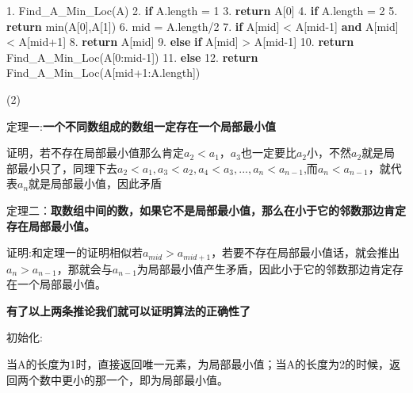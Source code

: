 \documentclass[
]{article}
\newenvironment{Shaded}{}{}
\newcommand{\BuiltInTok}[1]{#1}
\newcommand{\ControlFlowTok}[1]{\textcolor[rgb]{0.00,0.44,0.13}{\textbf{#1}}}
\newcommand{\DecValTok}[1]{\textcolor[rgb]{0.25,0.63,0.44}{#1}}
\newcommand{\FloatTok}[1]{\textcolor[rgb]{0.25,0.63,0.44}{#1}}
\newcommand{\KeywordTok}[1]{\textcolor[rgb]{0.00,0.44,0.13}{\textbf{#1}}}
\newcommand{\NormalTok}[1]{#1}
\newcommand{\OperatorTok}[1]{\textcolor[rgb]{0.40,0.40,0.40}{#1}}
\begin{document}
\begin{Shaded}
\begin{Highlighting}[]
\FloatTok{1.}\NormalTok{ Find\_A\_Min\_Loc(A)}
\FloatTok{2.}   \ControlFlowTok{if}\NormalTok{ A.length }\OperatorTok{=} \DecValTok{1}
\FloatTok{3.}     \ControlFlowTok{return}\NormalTok{ A[}\DecValTok{0}\NormalTok{]}
\FloatTok{4.}   \ControlFlowTok{if}\NormalTok{ A.length }\OperatorTok{=} \DecValTok{2}
\FloatTok{5.}     \ControlFlowTok{return} \BuiltInTok{min}\NormalTok{(A[}\DecValTok{0}\NormalTok{],A[}\DecValTok{1}\NormalTok{])}
\FloatTok{6.}\NormalTok{   mid }\OperatorTok{=}\NormalTok{ A.length}\OperatorTok{/}\DecValTok{2}
\FloatTok{7.}   \ControlFlowTok{if}\NormalTok{ A[mid] }\OperatorTok{\textless{}}\NormalTok{ A[mid}\OperatorTok{{-}}\DecValTok{1}\NormalTok{] }\KeywordTok{and}\NormalTok{ A[mid] }\OperatorTok{\textless{}}\NormalTok{ A[mid}\OperatorTok{+}\DecValTok{1}\NormalTok{]}
\FloatTok{8.}   	\ControlFlowTok{return}\NormalTok{ A[mid]}
\FloatTok{9.}   \ControlFlowTok{else} \ControlFlowTok{if}\NormalTok{ A[mid] }\OperatorTok{\textgreater{}}\NormalTok{ A[mid}\OperatorTok{{-}}\DecValTok{1}\NormalTok{]}
\FloatTok{10.}  	\ControlFlowTok{return}\NormalTok{ Find\_A\_Min\_Loc(A[}\DecValTok{0}\NormalTok{:mid}\OperatorTok{{-}}\DecValTok{1}\NormalTok{])}
\FloatTok{11.}  \ControlFlowTok{else}
\FloatTok{12.}  	\ControlFlowTok{return}\NormalTok{ Find\_A\_Min\_Loc(A[mid}\OperatorTok{+}\DecValTok{1}\NormalTok{:A.length])   }
\end{Highlighting}
\end{Shaded}

(2)

定理一:\textbf{一个不同数组成的数组一定存在一个局部最小值}

证明，若不存在局部最小值那么肯定\(a_2<a_1\)，\(a_3\)也一定要比\(a_2\)小，不然\(a_2\)就是局部最小只了，同理下去\(a_2<a_1,a_3<a_2,a_4<a_3,...,a_n<a_{n-1}\),而\(a_n<a_{n-1}\)，就代表\(a_n\)就是局部最小值，因此矛盾

定理二：\textbf{取数组中间的数，如果它不是局部最小值，那么在小于它的邻数那边肯定存在局部最小值。}

证明:和定理一的证明相似若\(a_{mid}>a_{mid+1}\)，若要不存在局部最小值话，就会推出\(a_n>a_{n-1}\)，那就会与\(a_{n-1}\)为局部最小值产生矛盾，因此小于它的邻数那边肯定存在一个局部最小值。

\textbf{有了以上两条推论我们就可以证明算法的正确性了}

初始化:

当A的长度为1时，直接返回唯一元素，为局部最小值；当A的长度为2的时候，返回两个数中更小的那一个，即为局部最小值。
\end{document}
